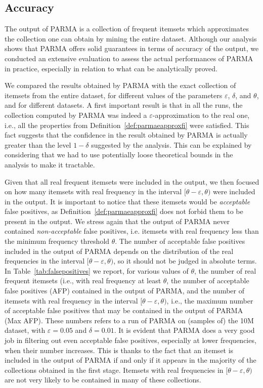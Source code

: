 \subsection{Accuracy}
The output of PARMA is a collection of frequent itemsets which approximates the
collection one can obtain by mining the entire dataset. Although our analysis
shows that PARMA offers solid guarantees in terms of accuracy of the output, we
conducted an extensive evaluation to assess the actual performances of PARMA in
practice, especially in relation to what can be analytically proved.

We compared the results obtained by PARMA with the exact collection of
itemsets from the entire dataset, for different values of the parameters
$\varepsilon$, $\delta$, and $\theta$, and for different datasets. A first important
result is that in all the runs, the collection computed by PARMA was indeed a
$\varepsilon$-approximation to the real one, i.e., all the properties from
Definition~\ref{def:parmaeapproxfi} were satisfied. This fact suggests that the confidence in
the result obtained by PARMA is actually greater than the level $1-\delta$
suggested by the analysis. This can be explained by considering that we had to
use potentially loose theoretical bounds in the analysis to make it tractable. 

Given that all real frequent itemsets were included in the output, we then
focused on how many itemsets with real frequency in the interval
$[\theta-\varepsilon,\theta)$ were included in the output. It is important to
notice that these itemsets would be \emph{acceptable} false positives, as
Definition~\ref{def:parmaeapproxfi} does not forbid them to be present in the output.
We stress again that the output of PARMA never contained \emph{non-acceptable}
false positives, i.e. itemsets with real frequency less than the minimum
frequency threshold $\theta$. The number of acceptable false positives included in the
output of PARMA depends on the distribution of the real frequencies in the
interval $[\theta-\varepsilon,\theta)$, so it should not be judged in absolute
terms. In Table~\ref{tab:falsepositives} we report, for various values of
$\theta$, the number of real frequent itemsets (i.e., with real frequency at
least $\theta$, the number of acceptable false positives (AFP) contained in the output
of PARMA, and the number of itemsets with real frequency in the interval
$[\theta-\varepsilon,\theta)$, i.e., the maximum number of acceptable false
positives that may be contained in the output of PARMA (Max AFP). These numbers
refers to a run of PARMA on (samples of) the 10M dataset, with
$\varepsilon=0.05$ and $\delta=0.01$. It is evident that PARMA does a very good
job in filtering out even acceptable false positives, especially at lower
frequencies, when their number increases. This is thanks to the fact that  an
itemset is included in the output of PARMA if and only if it appears in the
majority of the collections obtained in the first stage. Itemsets with real frequencies
in $[\theta-\varepsilon,\theta)$ are not very likely to be contained in many of
these collections.

